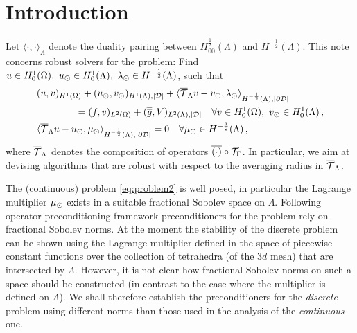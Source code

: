 \documentclass[r]{siamart171218}
\begin{document}
\newtheorem{thm}{Theorem}[section]
\newtheorem{prop}{Property}[section]
\theoremstyle{remark}
\newtheorem{remark}{Remark}[section]

\newtheorem{example}{Example}[section]

\section{Introduction}\label{sec:intro}

Let $\langle \cdot , \cdot \rangle_\Lambda$ denote the duality pairing between 
$H^\frac12_{00}(\Lambda)$ and $H^{-\frac12}(\Lambda)$. This note concerns robust
solvers for the problem:
Find $u \in H^1_0(\Omega),\ u_{\odot} \in H^1_0(\Lambda), \ \lambda_{\odot} \in H^{-\frac12}(\Lambda)$, such that
\begin{subequations}\label{eq:problem2}
\begin{align}
&(u,v)_{H^1(\Omega)} + (u_{\odot},v_{\odot})_{H^1(\Lambda),|\mathcal{D}|} 
+  \langle {\overline{\mathcal{T}}_\Lambda} v - v_{\odot}, \lambda_{\odot} \rangle_{H^{-\frac12}(\Lambda), |\partial\mathcal{D}|} 
\\
\nonumber
&\qquad\qquad= (f,v)_{L^2(\Omega)} +  (\overline{\overline{g}},V)_{L^2(\Lambda),|\mathcal{D}|}
\quad \forall v \in H^1_0(\Omega), \ v_{\odot} \in H^1_0(\Lambda)\,,
\\
&   \langle {\overline{\mathcal{T}}_\Lambda} u -   u_{\odot}, \mu_{\odot} \rangle_{H^{-\frac12}(\Lambda),|\partial\mathcal{D}|} = 0
\quad \forall \mu_{\odot} \in H^{-\frac12}(\Lambda)\,,
\end{align}
\end{subequations}
where ${\overline{\mathcal{T}}_\Lambda}$ denotes the composition of operators $\overline{(\cdot)} \circ {\mathcal{T}_\Gamma} $.
In particular, we aim at devising algorithms that are robust with respect to
the averaging radius in ${\overline{\mathcal{T}}_\Lambda}$.

The (continuous) problem \eqref{eq:problem2} is well posed, in particular
the Lagrange multiplier $\mu_{\odot}$ exists in a suitable fractional Sobolev space on
$\Lambda$. Following operator preconditioning framework \cite{mardal2011preconditioning} preconditioners
for the problem rely on fractional Sobolev norms. At the moment the stability
of the discrete problem can be shown using the Lagrange multiplier defined
in the space of piecewise constant functions over the collection of tetrahedra
(of the 3$d$ mesh) that are intersected by $\Lambda$. However, it is not clear
how fractional Sobolev norms on such a space should be constructed (in contrast
to the case where the multiplier is defined on $\Lambda$). We shall therefore
establish the preconditioners for the \emph{discrete} problem using different
norms than those used in the analysis of the \emph{continuous} one.
\end{document}
